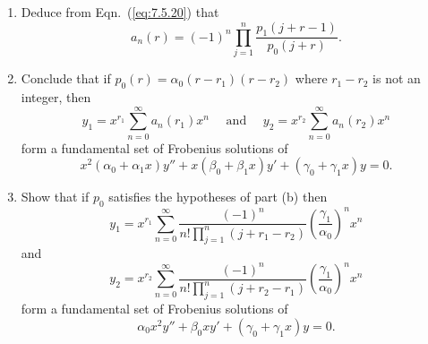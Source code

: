 \documentclass{ximera}
\begin{document}
\begin{problem}\label{exer:7.5.55}
\begin{enumerate}
\item %
Deduce from Eqn.~(\ref{eq:7.5.20}) that
$$
a_n(r)=(-1)^n\prod_{j=1}^n\frac{p_1(j+r-1)}{ p_0(j+r)}.
$$
\item %
Conclude that if $p_0(r)=\alpha_0(r-r_1)(r-r_2)$ where $r_1-r_2$
is not an integer, then
$$
y_1=x^{r_1}\sum_{n=0}^\infty a_n(r_1)x^n\quad\mbox{ and }\quad
y_2=x^{r_2}\sum_{n=0}^\infty a_n(r_2)x^n
$$
 form a fundamental set of  Frobenius solutions of
$$
x^2(\alpha_0+\alpha_1x)y''+x(\beta_0+\beta_1x)y'+(\gamma_0+\gamma_1x)y=0.
$$
\item %
Show that if $p_0$ satisfies the hypotheses of part (b) then
$$
y_1=x^{r_1}\sum_{n=0}^\infty \frac{(-1)^n}{ n!\prod_{j=1}^n(j+r_1-r_2)}
\left(\frac{\gamma_1}{\alpha_0}\right)^nx^n
$$
and
$$
y_2=x^{r_2}\sum_{n=0}^\infty \frac{(-1)^n}{ n!\prod_{j=1}^n(j+r_2-r_1)}
\left(\frac{\gamma_1}{\alpha_0}\right)^nx^n
$$
form a fundamental set of  Frobenius solutions of
$$
\alpha_0x^2y''+\beta_0xy'+(\gamma_0+\gamma_1x)y=0.
$$
\end{enumerate}
\end{problem}
\end{document}
